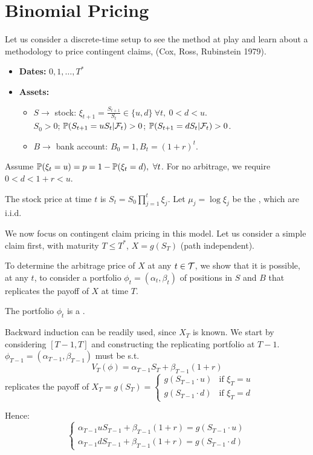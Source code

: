 \section{Binomial Pricing}

\begin{remark}
    Let us consider a discrete-time setup to see the  method at play and learn about a methodology to price contingent claims,  (Cox, Ross, Rubinstein 1979).
    
    \begin{itemize}
        \item \textbf{Dates:} $0, 1, \dots, T^*$
        \item \textbf{Assets:} 
        \begin{itemize}
            \item $S \to$ stock: $\xi_{t+1} = \frac{S_{t+1}}{S_t} \in \{u, d\} \ \forall t, \ 0 < d < u$. \\
            $S_0 > 0$; $\mathbb P(S_{t+1} = u S_t | \mathcal{F}_t) > 0$; $\mathbb P(S_{t+1} = d S_t | \mathcal{F}_t) > 0$.
            \item $B \to$ bank account: $B_0 = 1, B_t = (1+r)^t$.
        \end{itemize}
    \end{itemize}
    Assume $\mathbb P(\xi_t = u) = p = 1 - \mathbb P(\xi_t = d), \ \forall t$. For no arbitrage, we require $0 < d < 1+r < u$.
    
    The stock price at time $t$ is $S_t = S_0 \prod_{j=1}^t \xi_j$. Let $\mu_j = \log \xi_j$ be the , which are i.i.d.
\end{remark}

\begin{remark}
    We now focus on contingent claim pricing in this model. Let us consider a simple claim first, with maturity $T \leq T^*$, $X = g(S_T)$ (path independent).
    
    To determine the arbitrage price of $X$ at any $t \in \mathcal{T}$, we show that it is possible, at any $t$, to consider a portfolio $\phi_t = (\alpha_t, \beta_t)$ of positions in $S$ and $B$ that replicates the payoff of $X$ at time $T$.
    
    The portfolio $\phi_t$ is a .
    
    Backward induction can be readily used, since $X_T$ is known. We start by considering $[T-1, T]$ and constructing the replicating portfolio at $T-1$. $\phi_{T-1} = (\alpha_{T-1}, \beta_{T-1})$ must be s.t.
    \[ V_T(\phi) = \alpha_{T-1} S_T + \beta_{T-1} (1+r) \]
    replicates the payoff of $X_T = g(S_T) = \begin{cases} g(S_{T-1} \cdot u) & \text{if } \xi_T = u \\ g(S_{T-1} \cdot d) & \text{if } \xi_T = d \end{cases}$
    
    Hence:
    \[ \begin{cases} \alpha_{T-1} u S_{T-1} + \beta_{T-1} (1+r) = g(S_{T-1} \cdot u) \\ \alpha_{T-1} d S_{T-1} + \beta_{T-1} (1+r) = g(S_{T-1} \cdot d) \end{cases} \]
\end{remark}

